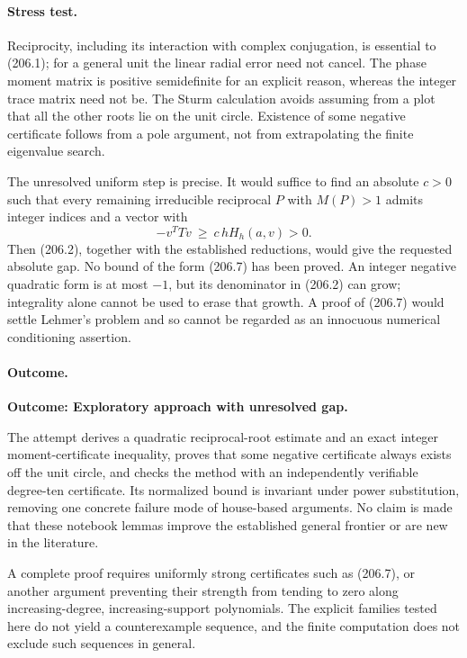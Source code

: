 \documentclass[11pt,a4paper]{article}
\begin{document}
\paragraph{Stress test.}
Reciprocity, including its interaction with complex conjugation, is
essential to (206.1); for a general unit the linear radial error need
not cancel. The phase moment matrix is positive semidefinite for an
explicit reason, whereas the integer trace matrix need not be. The
Sturm calculation avoids assuming from a plot that all the other roots
lie on the unit circle. Existence of some negative certificate follows
from a pole argument, not from extrapolating the finite eigenvalue search.

The unresolved uniform step is precise. It would suffice to find an
absolute $c>0$ such that every remaining irreducible reciprocal $P$
with $M(P)>1$ admits integer indices and a vector with
\[
 -v^TTv\ \ge\ c\,h H_h(a,v)>0. \tag{206.7}
\]
Then (206.2), together with the established reductions, would give the
requested absolute gap. No bound of the form (206.7) has been proved.
An integer negative quadratic form is at most $-1$, but its denominator
in (206.2) can grow; integrality alone cannot be used to erase that
growth. A proof of (206.7) would settle Lehmer's problem and so cannot
be regarded as an innocuous numerical conditioning assertion.

\paragraph{Outcome.}
\textbf{Outcome: Exploratory approach with unresolved gap.}

The attempt derives a quadratic reciprocal-root estimate and an exact
integer moment-certificate inequality, proves that some negative
certificate always exists off the unit circle, and checks the method
with an independently verifiable degree-ten certificate. Its normalized
bound is invariant under power substitution, removing one concrete
failure mode of house-based arguments. No claim is made that these
notebook lemmas improve the established general frontier or are new in
the literature.

A complete proof requires uniformly strong certificates such as (206.7),
or another argument preventing their strength from tending to zero
along increasing-degree, increasing-support polynomials. The explicit
families tested here do not yield a counterexample sequence, and the
finite computation does not exclude such sequences in general.
\end{document}
